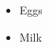 \documentclass{report}
\begin{document}
\begin{itemize}[itemsep=1ex]
\item Eggs
\item Milk
\end{itemize}
\end{document}
